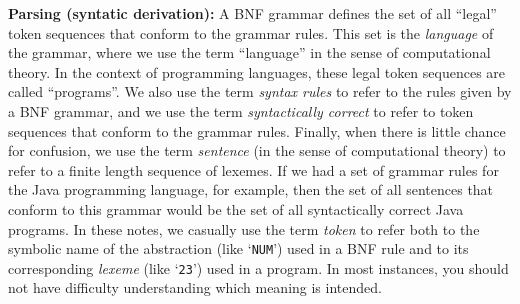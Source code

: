 \begin{minipage}[t]{\sw}
\slidenumber
\LARGE
{\bf Parsing (syntatic derivation):}\exx
\emm{\Large\LightBox{\MYlon}}\exx
A BNF grammar defines
the set of all ``legal'' token sequences
that conform to the grammar rules.
This set is the {\em language} of the grammar,
where we use the term ``language'' in the sense
of computational theory.
In the context of programming languages,
these legal token sequences are called ``programs''.
We also use the term {\em syntax rules} to refer
to the rules given by a BNF grammar,
and we use the term {\em syntactically correct} to refer
to token sequences that conform to the grammar rules.
Finally, when there is little chance for confusion,
we use the term {\em sentence} (in the sense of computational theory)
to refer to a finite length sequence of lexemes.\exx
If we had a set of grammar rules
for the Java programming language, for example,
then the set of all sentences that conform to this grammar
would be the set of all syntactically correct Java programs.\exx
In these notes,
we casually use the term {\em token}
to refer both to the symbolic name
of the abstraction (like `\verb'NUM'') used in a BNF rule
and to its corresponding {\em lexeme} (like `\verb'23'')
used in a program.
In most instances, you should not have difficulty
understanding which meaning is intended.
\end{minipage}
\clearpage
